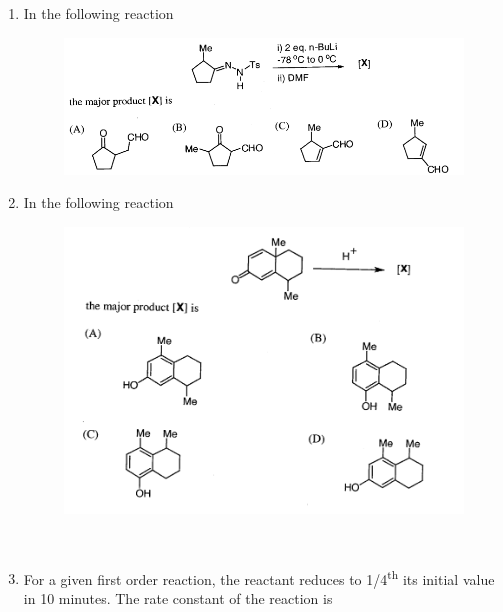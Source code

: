 \documentclass[journal,12pt,onecolumn]{IEEEtran}
\theoremstyle{remark}
\begin{document}
\begin{enumerate}
 

\item    \hspace{0.5cm} In the following reaction  \hfill{}

\begin{figure}
    \centering
    \includegraphics[width=\linewidth]{figs/image9.png} 
    \caption{}
    \label{fig:figure9}
\end{figure}
 

\item    \hspace{0.5cm} In the following reaction  \hfill{}

\begin{figure}
    \centering
    \includegraphics[width=\linewidth]{figs/image10.png}
    \caption{}
    \label{fig:figure10}
\end{figure}

\newpage
\


\item    \hspace{0.5cm} For a given first order reaction, the reactant reduces to 1/4\textsuperscript{th} its initial value in 10 minutes. The rate constant of the reaction is  \hfill{}


\end{enumerate}
\end{document}
